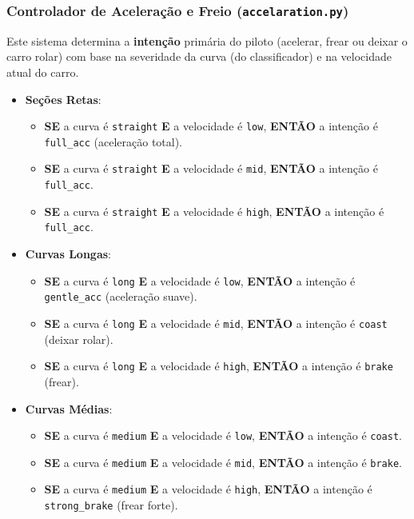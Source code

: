 \documentclass[12pt]{article}
\begin{document}
\subsubsection{Controlador de Aceleração e Freio (\texttt{accelaration.py})}
Este sistema determina a \textbf{intenção} primária do piloto (acelerar, frear ou deixar o carro rolar) com base na severidade da curva (do classificador) e na velocidade atual do carro.
\begin{itemize}[label=\textbullet, leftmargin=*]
    \item \textbf{Seções Retas}:
    \begin{itemize}
        \item \textbf{SE} a curva é \texttt{straight} \textbf{E} a velocidade é \texttt{low}, \textbf{ENTÃO} a intenção é \texttt{full\_acc} (aceleração total).
        \item \textbf{SE} a curva é \texttt{straight} \textbf{E} a velocidade é \texttt{mid}, \textbf{ENTÃO} a intenção é \texttt{full\_acc}.
        \item \textbf{SE} a curva é \texttt{straight} \textbf{E} a velocidade é \texttt{high}, \textbf{ENTÃO} a intenção é \texttt{full\_acc}.
    \end{itemize}
    \item \textbf{Curvas Longas}:
    \begin{itemize}
        \item \textbf{SE} a curva é \texttt{long} \textbf{E} a velocidade é \texttt{low}, \textbf{ENTÃO} a intenção é \texttt{gentle\_acc} (aceleração suave).
        \item \textbf{SE} a curva é \texttt{long} \textbf{E} a velocidade é \texttt{mid}, \textbf{ENTÃO} a intenção é \texttt{coast} (deixar rolar).
        \item \textbf{SE} a curva é \texttt{long} \textbf{E} a velocidade é \texttt{high}, \textbf{ENTÃO} a intenção é \texttt{brake} (frear).
    \end{itemize}
    \item \textbf{Curvas Médias}:
    \begin{itemize}
        \item \textbf{SE} a curva é \texttt{medium} \textbf{E} a velocidade é \texttt{low}, \textbf{ENTÃO} a intenção é \texttt{coast}.
        \item \textbf{SE} a curva é \texttt{medium} \textbf{E} a velocidade é \texttt{mid}, \textbf{ENTÃO} a intenção é \texttt{brake}.
        \item \textbf{SE} a curva é \texttt{medium} \textbf{E} a velocidade é \texttt{high}, \textbf{ENTÃO} a intenção é \texttt{strong\_brake} (frear forte).

\end{itemize}
\end{itemize}
\end{document}
